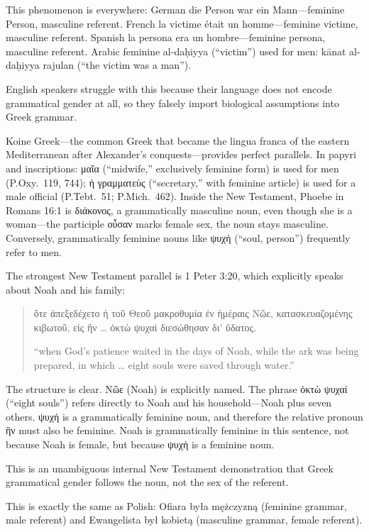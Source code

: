 This phenomenon is everywhere:
German die Person war ein Mann---feminine Person, masculine referent.
French la victime était un homme---feminine victime, masculine referent.
Spanish la persona era un hombre---feminine persona, masculine referent.
Arabic feminine al-daḥiyya (``victim'') used for men: kānat al-daḥiyya rajulan (``the victim was a man'').

English speakers struggle with this because their language does not encode grammatical gender at all, so they falsely import biological assumptions into Greek grammar.

Koine Greek---the common Greek that became the lingua franca of the eastern Mediterranean after Alexander's conquests---provides perfect parallels.
In papyri and inscriptions: μαῖα (``midwife,'' exclusively feminine form) is used for men (P.Oxy.\ 119, 744); ἡ γραμματεύς (``secretary,'' with feminine article) is used for a male official (P.Tebt.\ 51; P.Mich.\ 462).
Inside the New Testament, Phoebe in Romans 16:1 is διάκονος, a grammatically masculine noun, even though she is a woman---the participle οὖσαν marks female sex, the noun stays masculine.
Conversely, grammatically feminine nouns like ψυχή (``soul, person'') frequently refer to men.

The strongest New Testament parallel is 1 Peter 3:20, which explicitly speaks about Noah and his family:

\begin{quote}
ὅτε ἀπεξεδέχετο ἡ τοῦ Θεοῦ μακροθυμία ἐν ἡμέραις Νῶε, κατασκευαζομένης κιβωτοῦ, εἰς ἣν \ldots{} ὀκτὼ ψυχαὶ διεσώθησαν δι' ὕδατος.

``when God's patience waited in the days of Noah, while the ark was being prepared, in which \ldots{} eight souls were saved through water.''
\end{quote}

The structure is clear.
Νῶε (Noah) is explicitly named.
The phrase ὀκτὼ ψυχαί (``eight souls'') refers directly to Noah and his household---Noah plus seven others.
ψυχή is a grammatically feminine noun, and therefore the relative pronoun ἣν must also be feminine.
Noah is grammatically feminine in this sentence, not because Noah is female, but because ψυχή is a feminine noun.

This is an unambiguous internal New Testament demonstration that Greek grammatical gender follows the noun, not the sex of the referent.

This is exactly the same as Polish: Ofiara była mężczyzną (feminine grammar, male referent) and Ewangelista był kobietą (masculine grammar, female referent).

